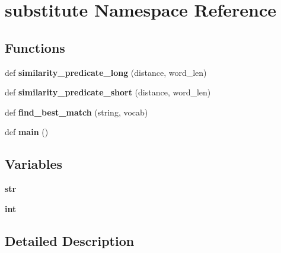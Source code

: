 \hypertarget{namespacesubstitute}{}\section{substitute Namespace Reference}
\label{namespacesubstitute}
\subsection*{Functions}
\begin{DoxyCompactItemize}
\item 
def {\bfseries similarity\+\_\+predicate\+\_\+long} (distance, word\+\_\+len)\hypertarget{namespacesubstitute_a2a4de05fc52058ce81f1103459ebcc61}{}\label{namespacesubstitute_a2a4de05fc52058ce81f1103459ebcc61}

\item 
def {\bfseries similarity\+\_\+predicate\+\_\+short} (distance, word\+\_\+len)\hypertarget{namespacesubstitute_a658725ae657269eaedbe1489033c2a28}{}\label{namespacesubstitute_a658725ae657269eaedbe1489033c2a28}

\item 
def {\bfseries find\+\_\+best\+\_\+match} (string, vocab)\hypertarget{namespacesubstitute_ad5a912aea3672e1f54c29840c8331a44}{}\label{namespacesubstitute_ad5a912aea3672e1f54c29840c8331a44}

\item 
def {\bfseries main} ()\hypertarget{namespacesubstitute_af037be2f849d46a6c4c85a0c67785674}{}\label{namespacesubstitute_af037be2f849d46a6c4c85a0c67785674}

\end{DoxyCompactItemize}
\subsection*{Variables}
\begin{DoxyCompactItemize}
\item 
{\bfseries str}\hypertarget{namespacesubstitute_a35c8a016e630a7194385b8b3f16ed78b}{}\label{namespacesubstitute_a35c8a016e630a7194385b8b3f16ed78b}

\item 
{\bfseries int}\hypertarget{namespacesubstitute_a1533b9b1555ce204a1d047280e500709}{}\label{namespacesubstitute_a1533b9b1555ce204a1d047280e500709}

\end{DoxyCompactItemize}


\subsection{Detailed Description}
\begin{DoxyVerb}\end{DoxyVerb}
 